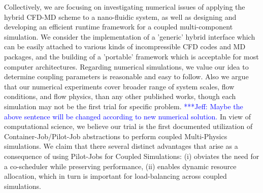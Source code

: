 \documentclass[conference,final]{IEEEtran}
\newcommand{\skonote}[1]{ {\textcolor{blue} { ***Jeff: #1 }}}
\newcommand{\skonote}[1]{}
\begin{document}
Collectively, we are focusing on investigating numerical issues of applying the hybrid CFD-MD scheme to a nano-fluidic system, as well as designing and developing an efficient runtime framework for a coupled multi-component simulation. We consider the implementation of a 'generic' hybrid interface which can be easily attached to various kinds of incompressible CFD codes and MD packages, and the building of a 'portable' framework which is acceptable for most computer architectures. Regarding numerical simulations, we value our idea to determine coupling parameters is reasonable and easy to follow. Also we argue that our numerical experiments cover broader range of system scales, flow conditions, and flow physics, than any other published works, though each simulation may not be the first trial for specific problem. 
\skonote{Maybe the above sentence will be changed according to new numerical solution.}
In view of computational science, we believe our trial is the first documented utilization of Container-Job/Pilot-Job abstractions to perform coupled Multi-Physics simulations. We claim that there several distinct advantages that arise as a consequence of using Pilot-Jobs for Coupled Simulations: (i) obviates the need for a co-scheduler while preserving performance, (ii) enables dynamic resource allocation, which in turn is important for load-balancing across coupled simulations. %
\end{document}
